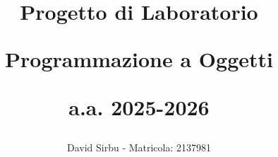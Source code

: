 \documentclass[11pt, a4paper]{article}
\title{Progetto di Laboratorio

Programmazione a Oggetti

a.a. 2025-2026}
\author{David Sirbu - Matricola: 2137981}
\begin{document}
\maketitle
\vfill

\tableofcontents
\newpage






\end{document}
